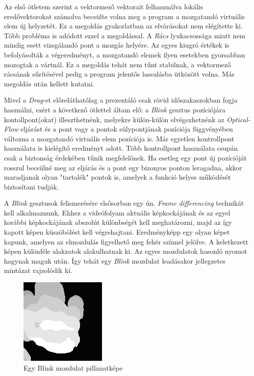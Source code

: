 Az első ötletem szerint a vektormező vektorait felhasználva lokális eredővektorokat számolva becsülte volna meg a program a mozgatandó virtuális elem új helyzetét. Ez a megoldás gyakorlatban az elvárásokat nem elégítette ki. Több probléma is adódott ezzel a megoldással. A \textit{Rács} lyukacsossága miatt nem mindig esett vizsgálandó pont a mozgás helyére. Az egyes kiugró értékek is befolyásolták a végeredményt, a mozgatandó elemek ilyen esetekben gyorsabban mozogtak a vártnál. Ez a megoldás tehát nem tűnt stabilnak, a vektormező rácsának sűrítésével pedig a program jelentős lassulásba ütközött volna. Más megoldás után kellett kutatni.

Mivel a \textit{Drag}-et előreláthatólag a prezentáló csak rövid időszakaszokban fogja használni, ezért a következő ötlettel áltam elő: a \textit{Blink} gesztus pozíciójára kontollpont(okat) illeszthetnénk, melyekre külön-külön elvégezhetnénk az \textit{Optical-Flow} eljárást és a pont vagy a pontok súlypontjának pozíciója függvényében változna a mozgatandó virtuális elem pozíciója is. Már egyetlen kontrollpont használata is kielégítő eredményt adott. Több kontrollpont használata csupán csak a biztonság érdekében tűnik megfelelőnek. Ha esetleg egy pont új pozícióját rosszul becsülné meg az eljárás és a pont egy bizonyos ponton leragadna, akkor maradjanak olyan "tartalék" pontok is, amelyek a funkció helyes működését biztosítani tudják.


A \textit{Blink} gesztusok felismerésére elsősorban egy ún. \textit{Frame differencing} technikát kell alkalmaznunk.
Ehhez a videófolyam aktuális képkockájának és az egyel korábbi képkockájának abszolút különbségét kell meghatározni, majd az így kapott képen küszöbölést kell végrehajtani. Eredményképp egy olyan képet kapunk, amelyen az elmozdulás figyelhető meg fehér színnel jelölve. A keletkezett képen különféle alakzatok alakulhatnak ki. Az egyes mozdulatok hasonló nyomot hagynak maguk után. Így tehát egy \textit{Blink} mozdulat leadásakor jellegzetes mintázat rajzolódik ki.

\begin{figure}[h]
\centering
\includegraphics[width=5truecm, height=5truecm]{images/Grab_screenshot.png}
\caption{Egy Blink mozdulat pillanatképe}
\label{fig:blink}
\end{figure}

